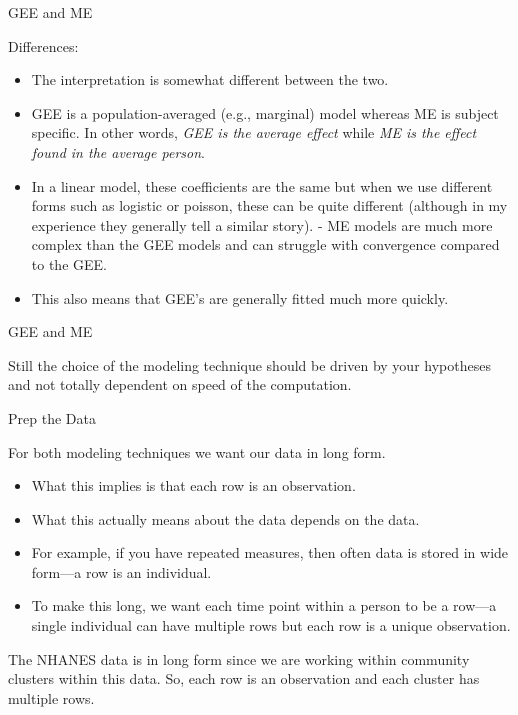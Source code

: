 \begin{frame}{GEE and ME}

Differences:

\begin{itemize}
\tightlist
\item
  The interpretation is somewhat different between the two.
\item
  GEE is a population-averaged (e.g., marginal) model whereas ME is
  subject specific. In other words, \emph{GEE is the average effect}
  while \emph{ME is the effect found in the average person}.
\item
  In a linear model, these coefficients are the same but when we use
  different forms such as logistic or poisson, these can be quite
  different (although in my experience they generally tell a similar
  story). - ME models are much more complex than the GEE models and can
  struggle with convergence compared to the GEE.
\item
  This also means that GEE's are generally fitted much more quickly.
\end{itemize}

\end{frame}

\begin{frame}{GEE and ME}

Still the choice of the modeling technique should be driven by your
hypotheses and not totally dependent on speed of the computation.

\end{frame}

\begin{frame}{Prep the Data}

For both modeling techniques we want our data in long form.

\begin{itemize}
\tightlist
\item
  What this implies is that each row is an observation.
\item
  What this actually means about the data depends on the data.
\item
  For example, if you have repeated measures, then often data is stored
  in wide form---a row is an individual.
\item
  To make this long, we want each time point within a person to be a
  row---a single individual can have multiple rows but each row is a
  unique observation.
\end{itemize}

The NHANES data is in long form since we are working within community
clusters within this data. So, each row is an observation and each
cluster has multiple rows.

\end{frame}

